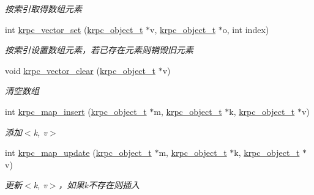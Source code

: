 \begin{DoxyCompactItemize}
\begin{DoxyCompactList}\small\item\em 按索引取得数组元素 \end{DoxyCompactList}\item 
int \hyperlink{a00119_gaf08956a35d983893f382974abcfca177_gaf08956a35d983893f382974abcfca177}{krpc\+\_\+vector\+\_\+set} (\hyperlink{a00056_a9c07dfc8c3b965f75b09f82fdb1bbb1e_a9c07dfc8c3b965f75b09f82fdb1bbb1e}{krpc\+\_\+object\+\_\+t} $\ast$v, \hyperlink{a00056_a9c07dfc8c3b965f75b09f82fdb1bbb1e_a9c07dfc8c3b965f75b09f82fdb1bbb1e}{krpc\+\_\+object\+\_\+t} $\ast$o, int index)
\begin{DoxyCompactList}\small\item\em 按索引设置数组元素，若已存在元素则销毁旧元素 \end{DoxyCompactList}\item 
void \hyperlink{a00119_ga02d5eeffe865f129911f42ffbfa0d119_ga02d5eeffe865f129911f42ffbfa0d119}{krpc\+\_\+vector\+\_\+clear} (\hyperlink{a00056_a9c07dfc8c3b965f75b09f82fdb1bbb1e_a9c07dfc8c3b965f75b09f82fdb1bbb1e}{krpc\+\_\+object\+\_\+t} $\ast$v)
\begin{DoxyCompactList}\small\item\em 清空数组 \end{DoxyCompactList}\item 
int \hyperlink{a00119_ga252615bf3ff115656c3c155a7c9fafaf_ga252615bf3ff115656c3c155a7c9fafaf}{krpc\+\_\+map\+\_\+insert} (\hyperlink{a00056_a9c07dfc8c3b965f75b09f82fdb1bbb1e_a9c07dfc8c3b965f75b09f82fdb1bbb1e}{krpc\+\_\+object\+\_\+t} $\ast$m, \hyperlink{a00056_a9c07dfc8c3b965f75b09f82fdb1bbb1e_a9c07dfc8c3b965f75b09f82fdb1bbb1e}{krpc\+\_\+object\+\_\+t} $\ast$k, \hyperlink{a00056_a9c07dfc8c3b965f75b09f82fdb1bbb1e_a9c07dfc8c3b965f75b09f82fdb1bbb1e}{krpc\+\_\+object\+\_\+t} $\ast$v)
\begin{DoxyCompactList}\small\item\em 添加$<$k, v$>$ \end{DoxyCompactList}\item 
int \hyperlink{a00119_gace78d56aa68df141f3cfa90ecf012b81_gace78d56aa68df141f3cfa90ecf012b81}{krpc\+\_\+map\+\_\+update} (\hyperlink{a00056_a9c07dfc8c3b965f75b09f82fdb1bbb1e_a9c07dfc8c3b965f75b09f82fdb1bbb1e}{krpc\+\_\+object\+\_\+t} $\ast$m, \hyperlink{a00056_a9c07dfc8c3b965f75b09f82fdb1bbb1e_a9c07dfc8c3b965f75b09f82fdb1bbb1e}{krpc\+\_\+object\+\_\+t} $\ast$k, \hyperlink{a00056_a9c07dfc8c3b965f75b09f82fdb1bbb1e_a9c07dfc8c3b965f75b09f82fdb1bbb1e}{krpc\+\_\+object\+\_\+t} $\ast$v)
\begin{DoxyCompactList}\small\item\em 更新$<$k, v$>$，如果k不存在则插入 \end{DoxyCompactList}\item 

\end{DoxyCompactItemize}
